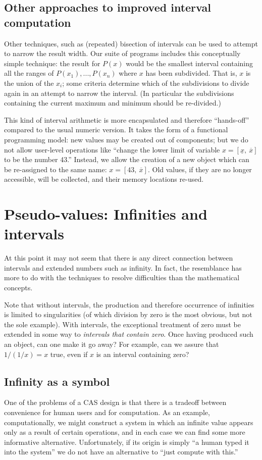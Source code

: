 \documentclass{article}
\begin{document}
\subsection{Other approaches to improved interval computation}
Other techniques, such as (repeated) bisection of intervals can be
used to attempt to narrow the result width. Our suite of programs
includes this conceptually simple technique: the result for $P(x)$
would be the smallest interval containing all the ranges of $P(x_1),
..., P(x_n)$ where $x$ has been subdivided.  That is, $x$ is the union
of the $x_i$; some criteria determine which of the subdivisions to
divide again in an attempt to narrow the interval. (In particular the subdivisions
containing the current maximum and minimum should be re-divided.)

This kind of interval arithmetic is more encapsulated and therefore
``hands-off'' compared to the usual numeric version.  It takes the
form of a functional programming model: new values may be created out
of components; but we do not allow user-level operations like ``change
the lower limit of variable $x=[{\underline x},~{\overline x}]$ to be
the number 43.'' Instead, we allow the creation of a new object which
can be re-assigned to the same name: $x=[43,~{\overline x}]$.  Old
values, if they are no longer accessible, will be collected, and their
memory locations re-used.

\section {Pseudo-values: Infinities and intervals}

At this point it may not seem that there is any direct connection
between intervals and extended numbers such as infinity. In fact,
the resemblance has more to do with the techniques to resolve
difficulties than the mathematical concepts.

Note that without intervals, the production and therefore occurrence
of infinities is limited to singularities (of which division by zero
is the most obvious, but not the sole example).  With intervals, the
exceptional treatment of zero must be extended in some way to {\em
intervals that contain zero}.  Once having produced such an object,
can one make it go away?  For example, can we assure that $1/(1/x)=x$
true, even if $x$ is an interval containing zero?

\subsection{Infinity as a symbol}
One of the problems of a CAS design is that there is a tradeoff
between convenience for human users and for computation. As an
example, computationally, we might construct a system in which an
infinite value appears only as a result of certain operations, and in
each case we can find some more informative alternative. Unfortunately,
if its origin is simply ``a human typed it into the system'' we do not
have an alternative to ``just compute with this.''
\end{document}
